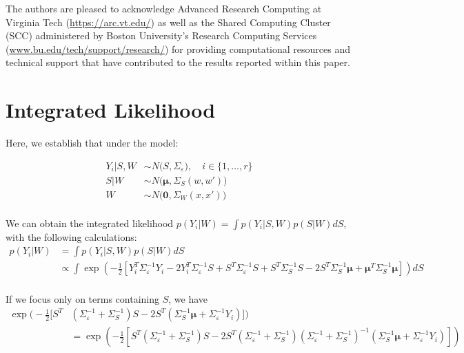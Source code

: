 \documentclass[11pt]{article}
\begin{document}
The authors are pleased to acknowledge Advanced Research Computing at Virginia Tech 
(\url{https://arc.vt.edu/}) as well as the Shared Computing Cluster (SCC) administered
by Boston University's Research Computing Services (\url{www.bu.edu/tech/support/research/})
for providing computational resources and technical support that have contributed 
to the results reported within this paper.

\appendix
\renewcommand{\thesection}{Appendix \Alph{section}}

\section{Integrated Likelihood}
\label{sec:apdx_int_lik}
Here, we establish that under the model:

$$
\begin{aligned}
Y_i|S,W &\sim N\big(S, \Sigma_\varepsilon\big), \quad i \in \{1,\dots, r\}\\
S|W &\sim N\big(\boldsymbol{\mu}, \Sigma_S(w,w')\big)\\
W &\sim N\big(\mathbf{0}, \Sigma_W(x,x')\big) \\
\end{aligned}
$$

We can obtain the integrated likelihood $p(Y_i|W)=\int p(Y_i|S,W)p(S|W) dS$, 
with the following calculations:
$$
\begin{aligned}
p(Y_i|W) &= \int p(Y_i|S,W)p(S|W)dS \\
&\propto \int\exp\left(-\frac{1}{2} \left[Y_i^T\Sigma_\varepsilon^{-1} Y_i 
- 2Y_i^T\Sigma_\varepsilon^{-1} S + S^T \Sigma_\varepsilon^{-1} S + S^T \Sigma_S^{-1} S 
-2S^T \Sigma_S^{-1} \boldsymbol{\mu} 
+ \boldsymbol{\mu}^T \Sigma_S^{-1} \boldsymbol{\mu} \right]\right)dS \\
\end{aligned}
$$

If we focus only on terms containing $S$, we have 
$$
\begin{aligned}
    \exp\Big(-\frac{1}{2} \big[S^T &(\Sigma_\varepsilon^{-1}+\Sigma_S^{-1}) S 
    -2S^T (\Sigma_S^{-1} \boldsymbol{\mu} + \Sigma_\varepsilon^{-1} Y_i) \big]\Big) \\
&= \exp\left(-\frac{1}{2} \left[S^T (\Sigma_\varepsilon^{-1}+\Sigma_S^{-1}) S 
-2S^T (\Sigma_\varepsilon^{-1}+\Sigma_S^{-1})(\Sigma_\varepsilon^{-1}
+\Sigma_S^{-1})^{-1}(\Sigma_S^{-1} \boldsymbol{\mu} + \Sigma_\varepsilon^{-1} Y_i) \right]\right)
\end{aligned}
$$
\end{document}
